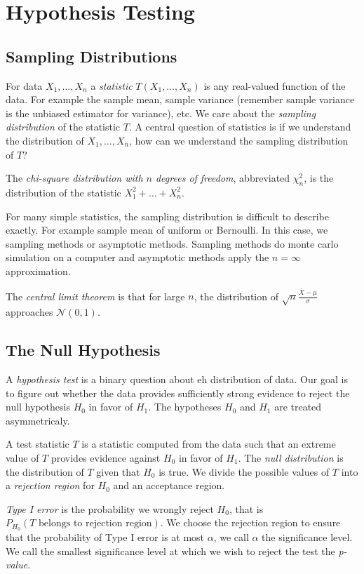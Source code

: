 \chapter{Hypothesis Testing}
\section{Sampling Distributions}
For data $X_1, \dots, X_n$ a {\it statistic} $T(X_1, \dots, X_n)$ is any real-valued function of the data. For example the sample mean, sample variance (remember sample variance is the unbiased estimator for variance), etc. We care about the {\it sampling distribution} of the statistic $T$. A central question of statistics is if we understand the distribution of $X_1, \dots, X_n$, how can we understand the sampling distribution of $T$? 

The {\it chi-square distribution with $n$ degrees of freedom}, abbreviated $\chi_n^2$, is the distribution of the statistic $X_1^2 + \dots + X_n^2$. 

For many simple statistics, the sampling distribution is difficult to describe exactly. For example sample mean of uniform or Bernoulli. In this case, we sampling methods or asymptotic methods. Sampling methods do monte carlo simulation on a computer and asymptotic methods apply the $n=\infty$ approximation. 

The {\it central limit theorem} is that for large $n$, the distribution of $\sqrt{n}\frac{\bar{X}-\mu}{\sigma}$ approaches $\mathcal{N}(0, 1)$. 

\section{The Null Hypothesis}
A {\it hypothesis test} is a binary question about eh distribution of data. Our goal is to figure out whether the data provides sufficiently strong evidence to reject the null hypothesis $H_0$ in favor of $H_1$. The hypotheses $H_0$ and $H_1$ are treated asymmetricaly. 

A test statistic $T$ is a statistic computed from the data such that an extreme value of $T$ provides evidence against $H_0$ in favor of $H_1$. The {\it null distribution} is the distribution of $T$ given that $H_0$ is true. We divide the possible values of $T$ into a {\it rejection region} for $H_0$ and an acceptance region. 

{\it Type I error} is the probability we wrongly reject $H_0$, that is $P_{H_0}(\text{$T$ belongs to rejection region})$. We choose the rejection region to ensure that the probability of Type I error is at most $\alpha$, we call $\alpha$ the significance level. We call the smallest significance level at which we wish to reject the test the {\it p-value}. 

